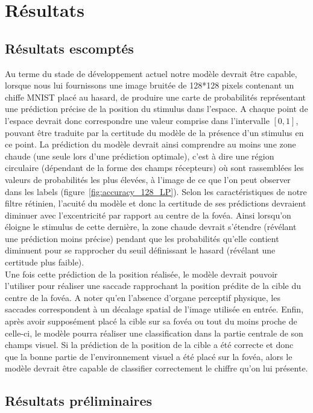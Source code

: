
\chapter{Résultats} %
 
\label{Résultats} %


\section{Résultats escomptés}

Au terme du stade de développement actuel notre modèle devrait être capable, lorsque nous lui fournissons une image bruitée de 128*128 pixels contenant un chiffe MNIST placé au hasard, de produire une carte de probabilités représentant une prédiction précise de la position du stimulus dans l'espace.
A chaque point de l'espace devrait donc correspondre une valeur comprise dans l'intervalle $[0,1]$, pouvant être traduite par la certitude du modèle de la présence d'un stimulus en ce point.
La prédiction du modèle devrait ainsi comprendre au moins une zone chaude (une seule lors d'une prédiction optimale), c'est à dire une région circulaire (dépendant de la forme des champs récepteurs) où sont rassemblées les valeurs de probabilités les plus élevées, à l'image de ce que l'on peut observer dans les labels (figure~\ref{fig:accuracy_128_LP}).
Selon les caractéristiques de notre filtre rétinien, l'acuité du modèle et donc la certitude de ses prédictions devraient diminuer avec l'excentricité par rapport au centre de la fovéa.
Ainsi lorsqu'on éloigne le stimulus de cette dernière, la zone chaude devrait s'étendre (révélant une prédiction moins précise) pendant que les probabilités qu'elle contient diminuent pour se rapprocher du seuil définissant le hasard (révélant une certitude plus faible). \autocite{Freeman2011, Werner2014} \\
Une fois cette prédiction de la position réalisée, le modèle devrait pouvoir l'utiliser pour réaliser une saccade rapprochant la position prédite de la cible du centre de la fovéa.
A noter qu'en l'absence d'organe perceptif physique, les saccades correspondent à un décalage spatial de l'image utilisée en entrée.
Enfin, après avoir supposément placé la cible sur sa fovéa ou tout du moins proche de celle-ci, le modèle pourra réaliser une classification dans la partie centrale de son champs visuel.
Si la prédiction de la position de la cible a été correcte et donc que la bonne partie de l'environnement visuel a été placé sur la fovéa, alors le modèle devrait être capable de classifier correctement le chiffre qu'on lui présente. \autocite{Werner2014}

\section{Résultats préliminaires}